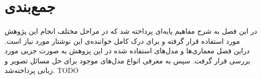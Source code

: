 


\section{جمع‌بندی}
\paragraph{}
{
    در این فصل به شرح مفاهیم پایه‌ای پرداخته شد که در مراحل مختلف انجام
    این پژوهش مورد استفاده قرار گرفته و برای درک کامل خواننده‌ی
    این نوشتار مورد نیاز است.
    دراین فصل معماری‌ها و مدل‌های استفاده شده در این پزوهش به صورت جزیی مورد بررسی قرار
    گرفت. سپس به معرفی انواع مدل‌های موجود برای حل مسائل تصویر و زبانی پرداخته‌شد. 
    TODO
}
